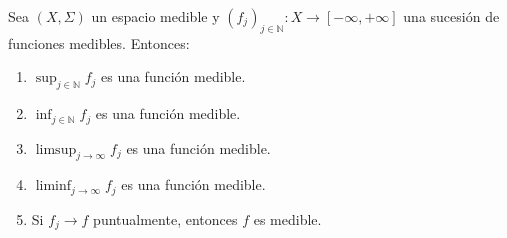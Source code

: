 \begin{teorema}
    Sea $(X, \Sigma)$ un espacio medible y $(f_j)_{j \in \mathbb{N}}: X \to [-\infty, +\infty]$ una sucesión de funciones medibles. Entonces:
    \vspace{-0.5em}
    \begin{enumerate}
        \item $\sup_{j \in \mathbb{N}} f_j$ es una función medible.
        \item $\inf_{j \in \mathbb{N}} f_j$ es una función medible.
        \item $\limsup_{j \to \infty} f_j$ es una función medible.
        \item $\liminf_{j \to \infty} f_j$ es una función medible.
        \item Si $f_j \to f$ puntualmente, entonces $f$ es medible.
    \end{enumerate}
\end{teorema}

